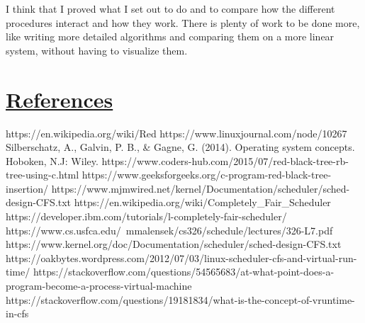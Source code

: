 \documentclass{article}
\begin{document}
I think that I proved what I set out to do and to compare how the different procedures interact and how they work. There is plenty of work to be done more, like writing more detailed algorithms and comparing them on a more linear system, without having to visualize them.

\newpage

\section{\underline{References}}

\begingroup
\renewcommand{\section}[2]{}%
\begin{thebibliography}{}
  https://en.wikipedia.org/wiki/Red%
  https://www.linuxjournal.com/node/10267
  Silberschatz, A., Galvin, P. B., \& Gagne, G. (2014). Operating system concepts. Hoboken, N.J: Wiley.
  https://www.coders-hub.com/2015/07/red-black-tree-rb-tree-using-c.html
  https://www.geeksforgeeks.org/c-program-red-black-tree-insertion/
  https://www.mjmwired.net/kernel/Documentation/scheduler/sched-design-CFS.txt
  https://en.wikipedia.org/wiki/Completely\_Fair\_Scheduler
  https://developer.ibm.com/tutorials/l-completely-fair-scheduler/
  https://www.cs.usfca.edu/~mmalensek/cs326/schedule/lectures/326-L7.pdf
  https://www.kernel.org/doc/Documentation/scheduler/sched-design-CFS.txt
  https://oakbytes.wordpress.com/2012/07/03/linux-scheduler-cfs-and-virtual-run-time/
  https://stackoverflow.com/questions/54565683/at-what-point-does-a-program-become-a-process-virtual-machine
  https://stackoverflow.com/questions/19181834/what-is-the-concept-of-vruntime-in-cfs
\end{thebibliography}
\endgroup
\end{document}

